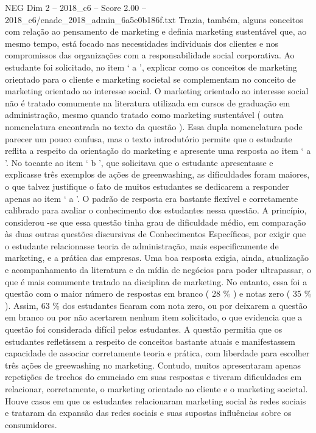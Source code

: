 \begin{textsample}{NEG Dim 2 – 2018\_c6 – Score 2.00 – 2018\_c6/enade\_2018\_admin\_6a5e0b186f.txt}
Trazia, também, alguns conceitos com relação ao pensamento de marketing e definia marketing sustentável que, ao mesmo tempo, está focado nas necessidades individuais dos clientes e nos compromissos das organizações com a responsabilidade social corporativa.
Ao estudante foi solicitado, no item ‘ a ’, explicar como os conceitos de marketing orientado para o cliente e marketing societal se complementam no conceito de marketing orientado ao interesse social.
O marketing orientado ao interesse social não é tratado comumente na literatura utilizada em cursos de graduação em administração, mesmo quando tratado como marketing sustentável ( outra nomenclatura encontrada no texto da questão ).
Essa dupla nomenclatura pode parecer um pouco confusa, mas o texto introdutório permite que o estudante reflita a respeito da orientação do marketing e apresente uma resposta ao item ‘ a ’.
No tocante ao item ‘ b ’, que solicitava que o estudante apresentasse e explicasse três exemplos de ações de greenwashing, as dificuldades foram maiores, o que talvez justifique o fato de muitos estudantes se dedicarem a responder apenas ao item ‘ a ’.
O padrão de resposta era bastante flexível e corretamente calibrado para avaliar o conhecimento dos estudantes nessa questão.
A princípio, considerou -se que essa questão tinha grau de dificuldade médio, em comparação às duas outras questões discursivas de Conhecimentos Específicos, por exigir que o estudante relacionasse teoria de administração, mais especificamente de marketing, e a prática das empresas.
Uma boa resposta exigia, ainda, atualização e acompanhamento da literatura e da mídia de negócios para poder ultrapassar, o que é mais comumente tratado na disciplina de marketing.
No entanto, essa foi a questão com o maior número de respostas em branco ( 28 \% ) e notas zero ( 35 \% ).
Assim, 63 \% dos estudantes ficaram com nota zero, ou por deixarem a questão em branco ou por não acertarem nenhum item solicitado, o que evidencia que a questão foi considerada difícil pelos estudantes.
A questão permitia que os estudantes refletissem a respeito de conceitos bastante atuais e manifestassem capacidade de associar corretamente teoria e prática, com liberdade para escolher três ações de greewashing no marketing.
Contudo, muitos apresentaram apenas repetições de trechos do enunciado em suas respostas e tiveram dificuldades em relacionar, corretamente, o marketing orientado ao cliente e o marketing societal.
Houve casos em que os estudantes relacionaram marketing social às redes sociais e trataram da expansão das redes sociais e suas supostas influências sobre os consumidores.

\end{textsample}
